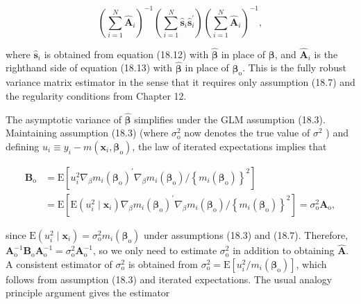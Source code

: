 \documentclass[10pt]{article}
\begin{document}
\begin{equation*}
\left(\sum_{i=1}^{N} \hat{\mathbf{A}}_{i}\right)^{-1}\left(\sum_{i=1}^{N} \hat{\mathbf{s}}_{i} \hat{\mathbf{s}}_{i}^{\prime}\right)\left(\sum_{i=1}^{N} \hat{\mathbf{A}}_{i}\right)^{-1}, \tag{18.14}
\end{equation*}


where $\hat{\mathbf{s}}_{i}$ is obtained from equation (18.12) with $\hat{\boldsymbol{\beta}}$ in place of $\boldsymbol{\beta}$, and $\hat{\mathbf{A}}_{i}$ is the righthand side of equation (18.13) with $\hat{\boldsymbol{\beta}}$ in place of $\boldsymbol{\beta}_{\mathrm{o}}$. This is the fully robust variance matrix estimator in the sense that it requires only assumption (18.7) and the regularity conditions from Chapter 12.

The asymptotic variance of $\hat{\boldsymbol{\beta}}$ simplifies under the GLM assumption (18.3). Maintaining assumption (18.3) (where $\sigma_{\mathrm{o}}^{2}$ now denotes the true value of $\sigma^{2}$ ) and defining $u_{i} \equiv y_{i}-m\left(\mathbf{x}_{i}, \boldsymbol{\beta}_{\mathrm{o}}\right)$, the law of iterated expectations implies that

$$
\begin{aligned}
\mathbf{B}_{\mathrm{o}} & =\mathrm{E}\left[u_{i}^{2} \nabla_{\beta} m_{i}\left(\boldsymbol{\beta}_{\mathrm{o}}\right)^{\prime} \nabla_{\beta} m_{i}\left(\boldsymbol{\beta}_{\mathrm{o}}\right) /\left\{m_{i}\left(\boldsymbol{\beta}_{\mathrm{o}}\right)\right\}^{2}\right] \\
& =\mathrm{E}\left[\mathrm{E}\left(u_{i}^{2} \mid \mathbf{x}_{i}\right) \nabla_{\beta} m_{i}\left(\boldsymbol{\beta}_{\mathrm{o}}\right)^{\prime} \nabla_{\beta} m_{i}\left(\boldsymbol{\beta}_{\mathrm{o}}\right) /\left\{m_{i}\left(\boldsymbol{\beta}_{\mathrm{o}}\right)\right\}^{2}\right]=\sigma_{\mathrm{o}}^{2} \mathbf{A}_{\mathrm{o}},
\end{aligned}
$$

since $\mathrm{E}\left(u_{i}^{2} \mid \mathbf{x}_{i}\right)=\sigma_{\mathrm{o}}^{2} m_{i}\left(\boldsymbol{\beta}_{\mathrm{o}}\right)$ under assumptions (18.3) and (18.7). Therefore, $\mathbf{A}_{\mathrm{o}}^{-1} \mathbf{B}_{\mathrm{o}} \mathbf{A}_{\mathrm{o}}^{-1} =\sigma_{\mathrm{o}}^{2} \mathbf{A}_{\mathrm{o}}^{-1}$, so we only need to estimate $\sigma_{\mathrm{o}}^{2}$ in addition to obtaining $\hat{\mathbf{A}}$. A consistent estimator of $\sigma_{\mathrm{o}}^{2}$ is obtained from $\sigma_{\mathrm{o}}^{2}=\mathrm{E}\left[u_{i}^{2} / m_{i}\left(\boldsymbol{\beta}_{\mathrm{o}}\right)\right]$, which follows from assumption (18.3) and iterated expectations. The usual analogy principle argument gives the estimator
\end{document}

